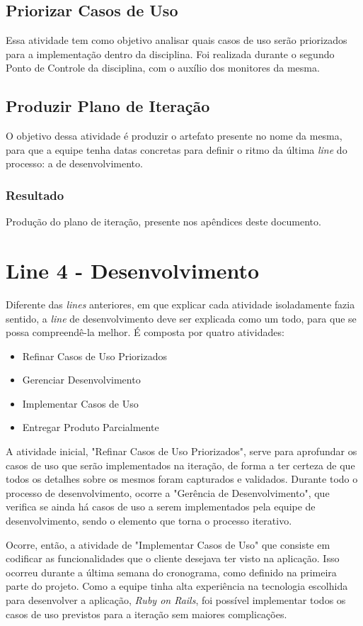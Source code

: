 \subsection{Priorizar Casos de Uso}
Essa atividade tem como objetivo analisar quais casos de uso serão priorizados para a implementação dentro da disciplina. Foi realizada durante o segundo Ponto de Controle da disciplina, com o auxílio dos monitores da mesma.

\subsection{Produzir Plano de Iteração}
O objetivo dessa atividade é produzir o artefato presente no nome da mesma, para que a equipe tenha datas concretas para definir o ritmo da última \textit{line} do processo: a de desenvolvimento.

\subsubsection{Resultado}
Produção do plano de iteração, presente nos apêndices deste documento.

\section{Line 4 - Desenvolvimento}
Diferente das \textit{lines} anteriores, em que explicar cada atividade isoladamente fazia sentido, a \textit{line} de desenvolvimento deve ser explicada como um todo, para que se possa compreendê-la melhor. É composta por quatro atividades:
\begin{itemize}
\item Refinar Casos de Uso Priorizados
\item Gerenciar Desenvolvimento
\item Implementar Casos de Uso
\item Entregar Produto Parcialmente
\end{itemize}

A atividade inicial, "Refinar Casos de Uso Priorizados", serve para aprofundar os casos de uso que serão implementados na iteração, de forma a ter certeza de que todos os detalhes sobre os mesmos foram capturados e validados. Durante todo o processo de desenvolvimento, ocorre a "Gerência de Desenvolvimento", que verifica se ainda há casos de uso a serem implementados pela equipe de desenvolvimento, sendo o elemento que torna o processo iterativo.

Ocorre, então, a atividade de "Implementar Casos de Uso" que consiste em codificar as funcionalidades que o cliente desejava ter visto na aplicação. Isso ocorreu durante a última semana do cronograma, como definido na primeira parte do projeto.  Como a equipe tinha alta experiência na tecnologia escolhida para desenvolver a aplicação, \textit{Ruby on Rails}, foi possível implementar todos os casos de uso previstos para a iteração sem maiores complicações.

